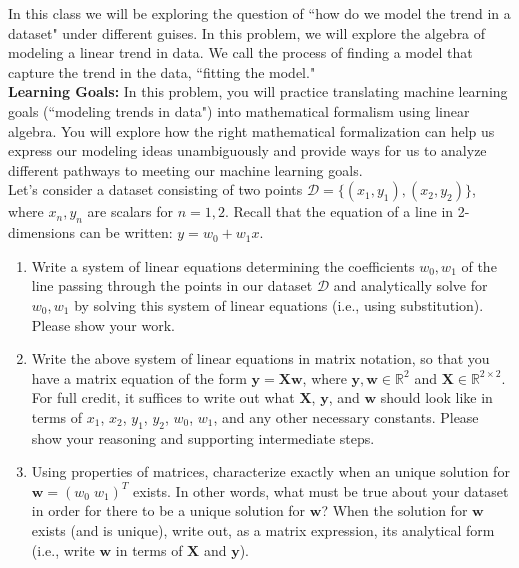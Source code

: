 \documentclass{harvardml}
\theoremstyle{definition}
\theoremstyle{plain}
\begin{document}
\begin{problem}
In this class we will be exploring the question of ``how do we model the trend in a dataset" under different guises. In this problem, we will explore the algebra of modeling a linear trend in data. We call the process of finding a model that capture the trend in the data, ``fitting the model."\\

\noindent \textbf{Learning Goals:} In this problem, you will practice translating machine learning goals (``modeling trends in data") into mathematical formalism using linear algebra. You will explore how the right mathematical formalization can help us express our modeling ideas unambiguously and provide ways for us to analyze different pathways to meeting our machine learning goals.\\

\noindent Let's consider a dataset consisting of two points $\mathcal{D} = \{(x_1, y_1), (x_2, y_2)\}$, where $x_n, y_n$ are scalars for $n=1, 2$. Recall that the equation of a line in 2-dimensions can be written: $y = w_0 + w_1x$. 
\begin{enumerate}
    \item Write a system of linear equations determining the coefficients $w_0, w_1$ of the line passing through the points in our dataset $\mathcal{D}$ and analytically solve for $w_0, w_1$ by solving this system of linear equations (i.e., using substitution). Please show your work.
    \item Write the above system of linear equations in matrix notation, so that you have a matrix equation of the form $\mathbf{y} = \mathbf{X}\mathbf{w}$, where $\mathbf{y}, \mathbf{w} \in \mathbb{R}^2$ and $\mathbf{X} \in \mathbb{R}^{2\times 2}$. For full credit, it suffices to write out what $\mathbf{X}$, $\mathbf{y}$, and $\mathbf{w}$ should look like in terms of $x_1$, $x_2$, $y_1$, $y_2$, $w_0$, $w_1$, and any other necessary constants. Please show your reasoning and supporting intermediate steps.
    \item Using properties of matrices, characterize exactly when an unique solution for  $\mathbf{w}=\left(w_0 \; w_1 \right)^{T}$ exists. In other words, what must be true about your dataset in order for there to be a unique solution for $\mathbf{w}$? When the solution for $\mathbf{w}$ exists (and is unique), write out, as a matrix expression, its analytical form (i.e., write $\mathbf{w}$ in terms of $\mathbf{X}$ and $\mathbf{y}$).
    

\end{enumerate}
\end{problem}
\end{document}

